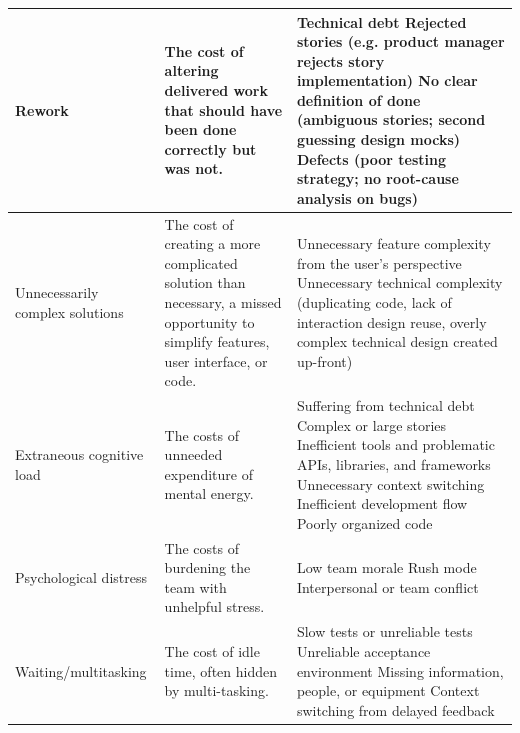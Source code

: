 \begin{table}[t]
\begin{tabular}{|p{1.5in}|p{1.9in}|p{3.2in}|}
Rework                                & The cost of altering delivered work that should have been done correctly but was not. & 
Technical debt \newline
Rejected stories (e.g. product manager rejects story implementation) \newline 
No clear definition of done (ambiguous stories; second guessing design mocks) \newline Defects (poor testing strategy; no root-cause analysis on bugs)                                                                                                                                                                   \\ \hline
Unnecessarily complex solutions  & The cost of creating a more complicated solution than necessary,  a missed opportunity to simplify features, user interface, or code.      & 
Unnecessary feature complexity from the user's perspective \newline
Unnecessary technical complexity (duplicating code, lack of interaction design reuse, overly complex technical design created up-front)
\\ \hline
Extraneous cognitive load &  The costs of unneeded expenditure of mental energy.  &  
Suffering from technical debt \newline	
Complex or large stories \newline	
Inefficient tools and problematic APIs, libraries, and frameworks \newline	
Unnecessary context switching \newline	
Inefficient development flow \newline	
Poorly organized code	
\\ \hline
Psychological distress & The costs of burdening the team with unhelpful stress. &  
Low team morale \newline
Rush mode \newline
Interpersonal or team conflict
\\ \hline
Waiting/multitasking                             & The cost of idle time, often hidden by multi-tasking. & Slow tests or unreliable tests \newline Unreliable acceptance environment \newline Missing information, people, or equipment \newline
Context switching from delayed feedback                                                                                                                                                                                                                                                                          \\ \hline

\end{tabular}
\end{table}
